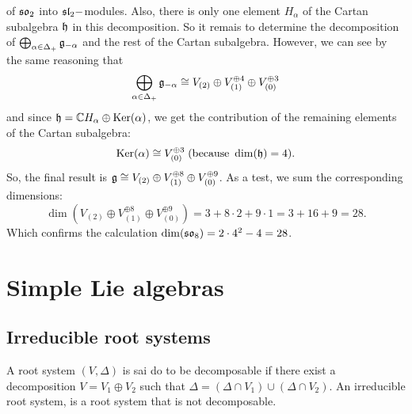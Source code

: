 of $\mathfrak{so}_2$ into $\mathfrak{sl}_2-$modules. Also, there is only one element $H_\alpha$ of the Cartan subalgebra $\mathfrak{h}$ in this decomposition.
So it remais to determine the decomposition of $\bigoplus_{\alpha\in\Delta_+}\mathfrak{g}_{-\alpha}$ and the rest of the Cartan 
subalgebra. However, we can see by the same reasoning that 
\begin{equation}
    \bigoplus_{\alpha\in\Delta_+}\mathfrak{g}_{-\alpha}\cong V_{(2)}\oplus V_{(1)}^{\oplus 4}\oplus V_{(0)}^{\oplus 3}
\end{equation}
and since $\mathfrak{h}=\mathbb{C} H_\alpha\oplus\text{Ker}(\alpha)$, we get the contribution of the remaining elements of the Cartan subalgebra:
\begin{equation}
    \text{Ker}(\alpha)\cong V_{(0)}^{\oplus 3}\;(\text{because }\dim(\mathfrak{h})=4).
\end{equation}
So, the final result is $\mathfrak{g}\cong V_{(2)}\oplus V_{(1)}^{\oplus 8}\oplus V_{(0)}^{\oplus 9}$. As a test, we sum the 
corresponding dimensions:
\begin{equation}
    \dim(V_{(2)}\oplus V_{(1)}^{\oplus 8}\oplus V_{(0)}^{\oplus 9})=3+8\cdot 2+9\cdot 1=3+16+9=28.
\end{equation}
Which confirms the calculation $\dim(\mathfrak{so}_8)=2\cdot 4^2-4=28$.


\section{Simple Lie algebras}
\subsection{Irreducible root systems}
\begin{dang}
    \begin{definition}
        A root system $(V,\Delta)$ is sai do to be decomposable if there exist a decomposition $V=V_1\oplus V_2$
        such that $\Delta=(\Delta\cap V_1)\cup (\Delta\cap V_2)$. An irreducible root system, is a root system 
        that is not decomposable.
    \end{definition}
\end{dang}

